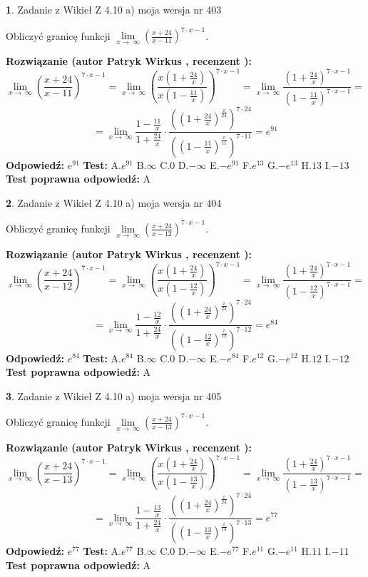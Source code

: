 \documentclass[12pt, a4paper]{article}
\theoremstyle{definition} %
\newtheorem{zad}{}
\newcommand{\zadStart}[1]{\begin{zad}#1\newline}
\newcommand{\zadStop}{\end{zad}}
\newcommand{\rozwStart}[2]{\noindent \textbf{Rozwiązanie (autor #1 , recenzent #2): }\newline}
\newcommand{\rozwStop}{\newline}
\newcommand{\odpStart}{\noindent \textbf{Odpowiedź:}\newline}
\newcommand{\odpStop}{\newline}
\newcommand{\testStart}{\noindent \textbf{Test:}\newline}
\newcommand{\testStop}{\newline}
\newcommand{\kluczStart}{\noindent \textbf{Test poprawna odpowiedź:}\newline}
\newcommand{\kluczStop}{\newline}
\begin{document}
\zadStart{Zadanie z Wikieł Z 4.10 a) moja wersja nr 403}

Obliczyć granicę funkcji  $\lim\limits_{x\to\ \infty}(\frac{x+24}{x-11})^{7\cdot x-1}$.
\zadStop
\rozwStart{Patryk Wirkus}{}
$$\lim\limits_{x\to\ \infty}(\frac{x+24}{x-11})^{7\cdot x-1} = \lim\limits_{x\to\ \infty}(\frac{x(1+\frac{24}{x})}{x(1-\frac{11}{x})})^{7\cdot x-1}=\lim\limits_{x\to\ \infty}\frac{(1+\frac{24}{x})^{7\cdot x-1}}{(1-\frac{11}{x})^{7\cdot x-1}}=$$
$$=\lim\limits_{x\to\ \infty}\frac{1-\frac{11}{x}}{1+\frac{24}{x}}\cdot\frac{((1+\frac{24}{x})^{\frac{x}{24}})^{7\cdot24}}{((1-\frac{11}{x})^{\frac{x}{11}})^{7\cdot11}}=e^{91}$$
\rozwStop
\odpStart
$e^{91}$
\odpStop
\testStart
A.$e^{91}$ B.$\infty$ C.$0$ D.$-\infty$ E.$-e^{91}$
F.$e^{13}$ G.$-e^{13}$
H.$13$
I.$-13$
\testStop
\kluczStart
A
\kluczStop



\zadStart{Zadanie z Wikieł Z 4.10 a) moja wersja nr 404}

Obliczyć granicę funkcji  $\lim\limits_{x\to\ \infty}(\frac{x+24}{x-12})^{7\cdot x-1}$.
\zadStop
\rozwStart{Patryk Wirkus}{}
$$\lim\limits_{x\to\ \infty}(\frac{x+24}{x-12})^{7\cdot x-1} = \lim\limits_{x\to\ \infty}(\frac{x(1+\frac{24}{x})}{x(1-\frac{12}{x})})^{7\cdot x-1}=\lim\limits_{x\to\ \infty}\frac{(1+\frac{24}{x})^{7\cdot x-1}}{(1-\frac{12}{x})^{7\cdot x-1}}=$$
$$=\lim\limits_{x\to\ \infty}\frac{1-\frac{12}{x}}{1+\frac{24}{x}}\cdot\frac{((1+\frac{24}{x})^{\frac{x}{24}})^{7\cdot24}}{((1-\frac{12}{x})^{\frac{x}{12}})^{7\cdot12}}=e^{84}$$
\rozwStop
\odpStart
$e^{84}$
\odpStop
\testStart
A.$e^{84}$ B.$\infty$ C.$0$ D.$-\infty$ E.$-e^{84}$
F.$e^{12}$ G.$-e^{12}$
H.$12$
I.$-12$
\testStop
\kluczStart
A
\kluczStop



\zadStart{Zadanie z Wikieł Z 4.10 a) moja wersja nr 405}

Obliczyć granicę funkcji  $\lim\limits_{x\to\ \infty}(\frac{x+24}{x-13})^{7\cdot x-1}$.
\zadStop
\rozwStart{Patryk Wirkus}{}
$$\lim\limits_{x\to\ \infty}(\frac{x+24}{x-13})^{7\cdot x-1} = \lim\limits_{x\to\ \infty}(\frac{x(1+\frac{24}{x})}{x(1-\frac{13}{x})})^{7\cdot x-1}=\lim\limits_{x\to\ \infty}\frac{(1+\frac{24}{x})^{7\cdot x-1}}{(1-\frac{13}{x})^{7\cdot x-1}}=$$
$$=\lim\limits_{x\to\ \infty}\frac{1-\frac{13}{x}}{1+\frac{24}{x}}\cdot\frac{((1+\frac{24}{x})^{\frac{x}{24}})^{7\cdot24}}{((1-\frac{13}{x})^{\frac{x}{13}})^{7\cdot13}}=e^{77}$$
\rozwStop
\odpStart
$e^{77}$
\odpStop
\testStart
A.$e^{77}$ B.$\infty$ C.$0$ D.$-\infty$ E.$-e^{77}$
F.$e^{11}$ G.$-e^{11}$
H.$11$
I.$-11$
\testStop
\kluczStart
A
\kluczStop
\end{document}
